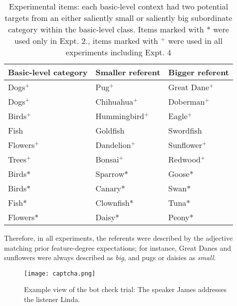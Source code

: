 \begin{table}[t]
	\small{
		\begin{center}
			\caption{Experimental items: each basic-level context had two potential targets from an either saliently small or saliently big subordinate category within the basic-level class. Items marked with * were used only in Expt. 2., items marked with $^{+}$ were used in all experiments including Expt. 4}
			\label{tab:stimuli}
			\vskip 0.12in
			\fontsize{10}{11}\selectfont
			\begin{tabularx}{\textwidth}{XXX}
				\hline
				Basic-level category & Smaller referent & Bigger referent\\
				\hline
				Dogs$^+$ & Pug$^+$ & Great Dane$^+$ \\
				Dogs$^+$ & Chihuahua$^+$ & Doberman$^+$\\
				Birds$^+$ & Hummingbird$^+$ & Eagle$^+$  \\
				Fish & Goldfish & Swordfish \\
				Flowers$^+$ & Dandelion$^+$ & Sunflower$^+$\\
				Trees$^+$ & Bonsai$^+$ & Redwood$^+$\\
				Birds* & Sparrow* & Goose* \\
				Birds* & Canary* & Swan* \\
				Fish* & Clownfish* & Tuna* \\
				Flowers* & Daisy* & Peony* \\
				\hline     
			\end{tabularx}
		\end{center}
	}
\end{table}

Therefore, in all experiments, the referents were described by the adjective matching prior feature-degree expectations; for instance, Great Danes and sunflowers were always described as \textit{big}, and pugs or daisies as \textit{small}. 

\begin{figure*}[t]
	\begin{center}
		\texttt{[image: captcha.png]}
	\end{center}
	\caption{Example view of the bot check trial: The speaker James addresses the listener Linda.}
	\label{captcha}
\end{figure*}

